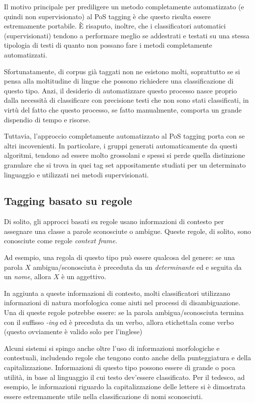 Il motivo principale per prediligere un metodo completamente automatizzato (e
quindi non supervisionato) al PoS tagging \`e che questo risulta essere estremamente
portabile. \`E risaputo, inoltre, che i classificatori automatici (supervisionati)
tendono a performare meglio se addestrati e testati su una stessa tipologia di
testi di quanto non possano fare i metodi completamente automatizzati.

Sfortunatamente, di corpus gi\`a taggati non ne esistono molti, soprattutto se
si pensa alla moltitudine di lingue che possono richiedere una classificazione
di questo tipo. Anzi, il desiderio di automatizzare questo processo nasce proprio
dalla necessit\`a di classificare con precisione testi che non sono stati classificati,
in virt\`u del fatto che questo processo, se fatto manualmente, comporta un grande
dispendio di tempo e risorse.

Tuttavia, l'approccio completamente automatizzato al PoS tagging porta con se
altri incovenienti. In particolare, i gruppi generati automaticamente da questi
algoritmi, tendono ad essere molto grossolani e spessi si perde quella distinzione
granulare che si trova in quei tag set appositamente studiati per un determinato
linguaggio e utilizzati nei metodi supervisionati.

\subsection{Tagging basato su regole}
\nocite{Brill:1992}
\nocite{Greene:1971}

Di solito, gli approcci basati su regole usano informazioni di contesto per
assegnare una classe a parole sconosciute o ambigue. Queste regole, di solito,
sono conosciute come regole \emph{context frame}.

Ad esempio, una regola di questo tipo pu\`o essere qualcosa del genere: se una
parola $X$ ambigua/sconosciuta \`e preceduta da un \emph{determinante} ed e
seguita da un \emph{nome}, allora $X$ \`e un aggettivo.

In aggiunta a queste informazioni di contesto, molti classificatori utilizzano
informazioni di natura morfologica come aiuti nel processi di disambiguazione.
Una di queste regole potrebbe essere: se la parola ambigua/sconosciuta termina
con il suffisso \emph{-ing} ed \`e preceduta da un verbo, allora etichettala come
verbo (questo ovviamente \`e valido solo per l'inglese)

Alcuni sistemi si spingo anche oltre l'uso di informazioni morfologiche e contestuali,
includendo regole che tengono conto anche della punteggiatura e della capitalizzazione.
Informazioni di questo tipo possono essere di grande o poca utilit\`a, in base
al linguaggio il cui testo dev'essere classificato. Per il tedesco, ad esempio,
le informazioni riguardo la capitalizzazione delle lettere si \`e dimostrata
essere estremamente utile nella classificazione di nomi sconosciuti.

